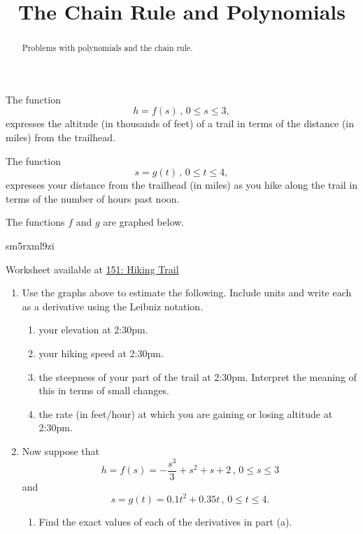 \documentclass{ximera}
\title{The Chain Rule and Polynomials}
\begin{document}
\begin{abstract}
Problems with polynomials and the chain rule.
\end{abstract}
\maketitle

\begin{question} \label{Q8dfDfrfrf}
The function
\[
      h = f(s) \, , \, 0\leq s \leq 3 ,
\]
expresses the altitude (in thousands of feet) of a trail in terms of the distance (in miles) from the trailhead.

The function
\[
    s = g(t) \, , \, 0\leq t \leq 4,
\]
expresses your distance from the trailhead (in miles) as you hike along the trail in terms of the number of hours past noon.

The functions $f$ and $g$ are graphed below.

\begin{onlineOnly}
    \begin{center}
   sm5rxml9zi
\end{center}
\end{onlineOnly}

Worksheet available at \href{https://www.desmos.com/calculator/sm5rxml9zi}{151: Hiking Trail}  %


\begin{enumerate}

\item Use the graphs above to estimate the following. Include units and write each as a derivative using the Leibniz notation.

\begin{enumerate}

\item your elevation at 2:30pm.

\item your hiking speed at 2:30pm.

\item the steepness of your part of the trail at 2:30pm. Interpret the meaning of this in terms of small changes.

\item the rate (in feet/hour) at which you are gaining or losing altitude at 2:30pm. 
\end{enumerate}

\item Now suppose that
\[
    h = f(s) = -\frac{s^3}{3} + s^2 + s + 2 \, , \, 0\leq s\leq 3
\]
and
\[
    s = g(t) = 0.1 t^2 + 0.35t \, , \, 0\leq t \leq 4.
\]

\begin{enumerate}
\item Find the exact values of each of the derivatives in part (a).
\end{enumerate}
\end{enumerate}

\end{question}
\end{document}
